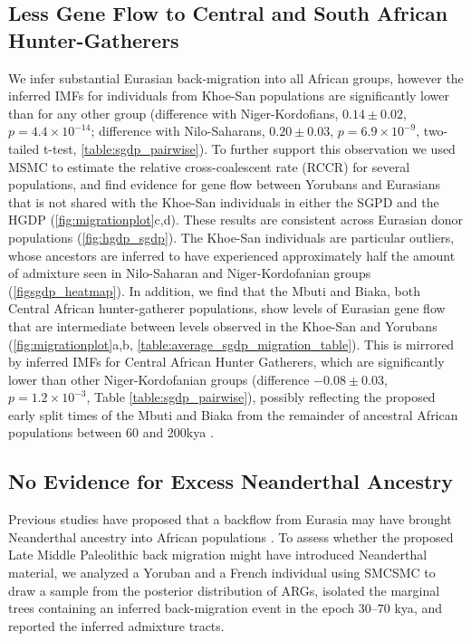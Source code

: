 \subsection{Less Gene Flow to Central and South African Hunter-Gatherers} We infer substantial Eurasian back-migration into all African groups, however the inferred IMFs for individuals from Khoe-San populations are significantly lower than for any other group (difference with Niger-Kordofians, $0.14 \pm 0.02$, $p = 4.4 \times 10^{-14}$; difference with Nilo-Saharans, $0.20 \pm 0.03$, $p = 6.9 \times 10^{-9}$, two-tailed t-test, \autoref{table:sgdp_pairwise}). To further support this observation we used MSMC to estimate the relative cross-coalescent rate (RCCR) for several populations, and find evidence for gene flow between Yorubans and Eurasians that is not shared with the Khoe-San individuals in either the SGPD and the HGDP (\autoref{fig:migrationplot}c,d). These results are consistent across Eurasian donor populations (\autoref{fig:hgdp_sgdp}). The Khoe-San individuals are particular outliers, whose ancestors are inferred to have experienced approximately half the amount of admixture seen in Nilo-Saharan and Niger-Kordofanian groups (\autoref{figsgdp_heatmap}). 
In addition, we find that the Mbuti and Biaka, both Central African hunter-gatherer populations, show levels of Eurasian gene flow that are intermediate between levels observed in the Khoe-San and Yorubans (\ref{fig:migrationplot}a,b, \autoref{table:average_sgdp_migration_table}).  This is mirrored by inferred IMFs for Central African Hunter Gatherers, which are significantly lower than other Niger-Kordofanian groups (difference $-0.08 \pm 0.03$, $p = 1.2 \times 10^{-3}$, Table \autoref{table:sgdp_pairwise}), possibly reflecting the proposed early split times of the Mbuti and Biaka from the remainder of ancestral African populations between 60 and 200kya \cite{Patin2017, Lipson2019}. 

\subsection{No Evidence for Excess Neanderthal Ancestry} Previous studies have proposed that a backflow from Eurasia may have brought Neanderthal ancestry into African populations \cite{Chen2020}. To assess whether the proposed Late Middle Paleolithic back migration might have introduced Neanderthal material, we analyzed a Yoruban and a French individual using SMCSMC to draw a sample from the posterior distribution of ARGs, isolated the marginal trees containing an inferred back-migration event in the epoch $30$--$70$ \gls{kya}, and reported the inferred admixture tracts. 


